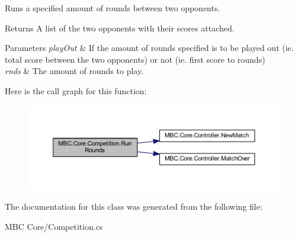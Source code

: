 Runs a specified amount of rounds between two opponents.

\begin{DoxyReturn}{Returns}
A list of the two opponents with their scores attached.
\end{DoxyReturn}

\begin{DoxyParams}{Parameters}
{\em play\-Out} & If the amount of rounds specified is to be played out (ie. total score between the two opponents) or not (ie. first score to rounds)\\
\hline
{\em rnds} & The amount of rounds to play.\\
\hline
\end{DoxyParams}


Here is the call graph for this function\-:
\nopagebreak
\begin{figure}[H]
\begin{center}
\leavevmode
\includegraphics[width=350pt]{class_m_b_c_1_1_core_1_1_competition_ae6f1520c4f77bef9f8b9760b40517857_cgraph}
\end{center}
\end{figure}




The documentation for this class was generated from the following file\-:\begin{DoxyCompactItemize}
\item 
M\-B\-C Core/Competition.\-cs\end{DoxyCompactItemize}
